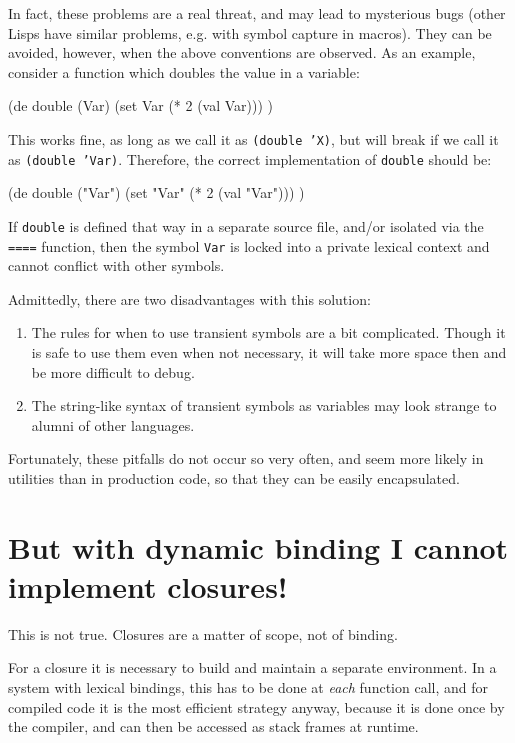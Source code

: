 In fact, these problems are a real threat, and may lead to mysterious
bugs (other Lisps have similar problems, e.g. with symbol capture in
macros). They can be avoided, however, when the above conventions are
observed. As an example, consider a function which doubles the value in
a variable:


\begin{wideverbatim}
(de double (Var)
   (set Var (* 2 (val Var))) )
\end{wideverbatim}

This works fine, as long as we call it as \texttt{(double 'X)}, but will break
if we call it as \texttt{(double 'Var)}. Therefore, the correct implementation
of \texttt{double} should be:


\begin{wideverbatim}
(de double ("Var")
   (set "Var" (* 2 (val "Var"))) )
\end{wideverbatim}

If \texttt{double} is defined that way in a separate source file,
and/or isolated via the \texttt{====} function, then the symbol
\texttt{Var} is locked into a private lexical context and cannot
conflict with other symbols.

Admittedly, there are two disadvantages with this solution:

\begin{enumerate}
\item The rules for when to use transient symbols are a bit complicated.
   Though it is safe to use them even when not necessary, it will take
   more space then and be more difficult to debug.
\item The string-like syntax of transient symbols as variables may look
   strange to alumni of other languages.
\end{enumerate}

Fortunately, these pitfalls do not occur so very often, and seem more
likely in utilities than in production code, so that they can be easily
encapsulated.

 
\section{But with dynamic binding I cannot implement closures!}
\label{sec:faq-but-with-dynamic-binding-i-cannot-implement-closures!}


This is not true. Closures are a matter of scope, not of binding.

For a closure it is necessary to build and maintain a separate
environment. In a system with lexical bindings, this has to be done at
\emph{each} function call, and for compiled code it is the most efficient
strategy anyway, because it is done once by the compiler, and can then
be accessed as stack frames at runtime.

